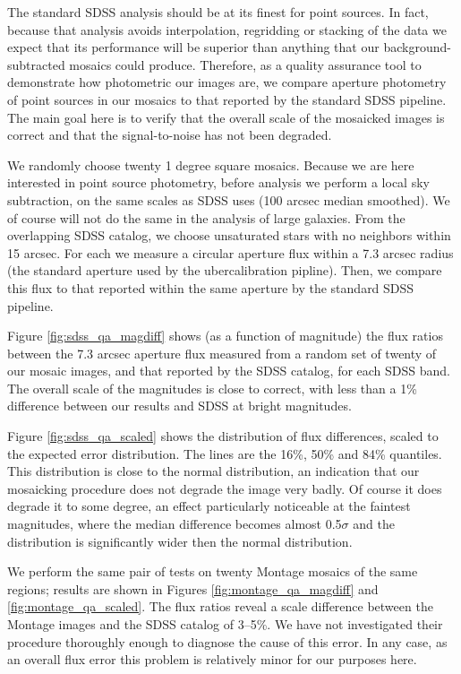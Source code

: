 \documentclass[10pt,preprint]{aastex}
\begin{document}
The standard SDSS analysis should be at its finest for point sources.
In fact, because that analysis avoids interpolation, regridding or
stacking of the data we expect that its performance will be superior
than anything that our background-subtracted mosaics could
produce. Therefore, as a quality assurance tool to demonstrate how
photometric our images are, we compare aperture photometry of point
sources in our mosaics to that reported by the standard SDSS
pipeline. The main goal here is to verify that the overall scale of
the mosaicked images is correct and that the signal-to-noise has not
been degraded.

We randomly choose twenty 1 degree square mosaics. Because we are here
interested in point source photometry, before analysis we perform a
local sky subtraction, on the same scales as SDSS uses (100 arcsec
median smoothed).  We of course will not do the same in the analysis
of large galaxies. From the overlapping SDSS catalog, we choose
unsaturated stars with no neighbors within 15 arcsec.  For each we
measure a circular aperture flux within a 7.3 arcsec radius (the
standard aperture used by the ubercalibration pipline).  Then, we
compare this flux to that reported within the same aperture by the
standard SDSS pipeline.

Figure \ref{fig:sdss_qa_magdiff} shows (as a function of magnitude)
the flux ratios between the 7.3 arcsec aperture flux measured from a
random set of twenty of our mosaic images, and that reported by the
SDSS catalog, for each SDSS band. The overall scale of the magnitudes
is close to correct, with less than a 1\% difference between our
results and SDSS at bright magnitudes.

Figure \ref{fig:sdss_qa_scaled} shows the distribution of flux
differences, scaled to the expected error distribution. The lines are
the 16\%, 50\% and 84\% quantiles. This distribution is close to the
normal distribution, an indication that our mosaicking procedure does
not degrade the image very badly.  Of course it does degrade it to
some degree, an effect particularly noticeable at the faintest
magnitudes, where the median difference becomes almost 0.5$\sigma$ and
the distribution is significantly wider then the normal distribution.

We perform the same pair of tests on twenty Montage mosaics of the
same regions; results are shown in Figures
\ref{fig:montage_qa_magdiff} and \ref{fig:montage_qa_scaled}.  The
flux ratios reveal a scale difference between the Montage
images and the SDSS catalog of 3--5\%.
We have not investigated their procedure thoroughly enough to diagnose
the cause of this error.  In any case, as an overall flux error this
problem is relatively minor for our purposes here.
\end{document}

